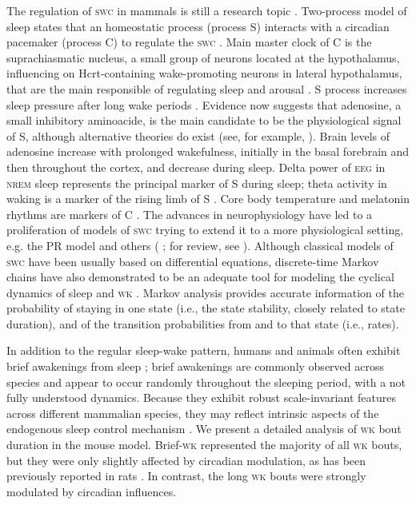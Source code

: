 \documentclass[10pt,letterpaper]{article}
\def\EEG/{\textsc{eeg}}
\def\NREM/{\textsc{nrem}}
\def\WK/{\textsc{wk}}
\def\SWC/{\textsc{swc}}
\def\EEG/{\textsc{eeg}}
\begin{document}
The regulation of \SWC/ in mammals is  still a research topic \cite{brown2012control}. Two-process model of sleep  states that an homeostatic process (process S) interacts with a circadian pacemaker (process C) to regulate the \SWC/ \cite{Borbely1982,Borbely2016}.  Main  master clock of C  is the suprachiasmatic nucleus, a small group of neurons located at the hypothalamus, influencing on Hcrt-containing wake-promoting neurons in lateral hypothalamus, that  are the main responsible of regulating sleep and arousal \cite{Aston-Jones2001,fleshner2011circadian}. S process increases sleep pressure   after long wake periods \cite{fleshner2011circadian,vassalli2017hypocretin}.  Evidence now suggests  that adenosine, a small inhibitory aminoacide, is the main candidate to be the physiological signal of S, although alternative theories do exist (see, for example, \cite{xie2013sleep}). Brain levels of adenosine increase with prolonged wakefulness, initially in the basal forebrain and then throughout the cortex, and decrease during sleep.  Delta power of \EEG/ in \NREM/ sleep  represents the principal marker of S during sleep; theta activity in waking is a marker of the rising limb of S \cite{finelli2000dual}. Core body temperature and melatonin rhythms are markers of C \cite{Borbely2016}.  The advances in neurophysiology have led to a proliferation of models of \SWC/ trying to extend it to a more physiological setting, e.g. the PR model and others (\cite{Phillips2007,tamakawa2006quartet,kumar2012mathematical,rempe2010mathematical,Behn2007} ; for review, see \cite{booth2014physiologically}). Although classical models of \SWC/ have been usually based on differential equations, discrete-time Markov chains have also demonstrated to be  an adequate tool for modeling  the cyclical dynamics of sleep and \WK/ \cite{Ferri2016,Spedicato2015,Mochizuki2004,Kemp1986,Kim2009}. Markov analysis provides accurate information of the probability of staying in one state (i.e., the state stability, closely related to state duration), and of the transition probabilities from and to that state (i.e., rates).


In addition to the regular sleep-wake pattern, humans and animals often exhibit brief awakenings from sleep \cite{Lo2004}; brief awakenings  are commonly observed across species and appear to occur randomly throughout the sleeping period, with a not fully understood dynamics. Because they  exhibit robust scale-invariant features across different mammalian species,  they may reflect intrinsic aspects of the endogenous sleep control mechanism \cite{Lo2004}. We  present a detailed analysis of \WK/ bout duration in the mouse model. Brief-\WK/ represented the majority of all \WK/ bouts, but they were only  slightly affected by circadian modulation, as has been previously reported in rats \cite{stephenson2013statistical}. In contrast, the long \WK/ bouts were strongly modulated by circadian influences. 
\end{document}
